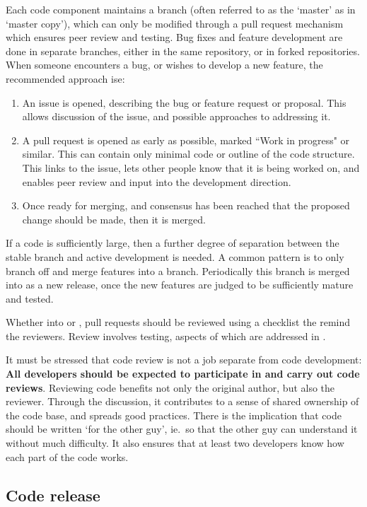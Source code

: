 Each code component maintains a  branch (often referred to as the `master'
as in `master copy'), which can only be modified
through a pull request mechanism which ensures peer review and testing. Bug fixes
and feature development are done in separate branches, either in the same
repository, or in forked repositories. When someone encounters a bug, or wishes to
develop a new feature, the recommended approach ise:

\begin{enumerate}
\item An issue is opened, describing the bug or feature request or proposal. This
allows discussion of the issue, and possible approaches to addressing it.
\item A pull request is opened as early as possible, marked ``Work in
progress" or similar. This can contain only minimal code or outline
of the code structure. This links to the issue, lets other people
know that it is being worked on, and enables peer review and input
into the development direction.
\item Once ready for merging, and consensus has been reached that the proposed change
should be made, then it is merged.
\end{enumerate}

If a code is sufficiently large, then a further degree of separation between
the stable  branch and active development is needed. A common pattern
is to only branch off and merge features into a   branch. Periodically
this branch is merged into  as a new release, once the new features 
are judged to be sufficiently mature and tested.

Whether into  or , pull requests should be reviewed
using a checklist the remind the reviewers. 
Review involves testing, aspects of which are addressed in .

It must be stressed that code review is not a job separate from
code development: {\bf All developers should be expected to participate in
and carry out code reviews}. Reviewing code benefits not only the
original author, but also the reviewer. Through the discussion, it
contributes to a sense of shared ownership of the code base, and
spreads good practices. There is the implication that code should be
written `for the other guy', ie.\ so that the other guy can understand it
without much difficulty.  It also ensures that at least two developers
know how each part of the code works.

\subsection{Code release}

